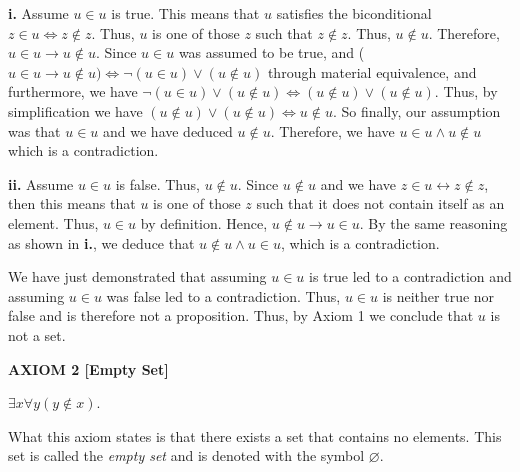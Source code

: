 \documentclass[12pt, a4paper]{article}
\begin{document}
\vspace{4mm}

\textbf{i.} Assume $u\in u$ is true. This means that $u$ satisfies the biconditional $z\in u\Leftrightarrow z\notin z$. Thus, $u$ is one of those $z$ such that $z\notin z$. Thus, $u\notin u$. Therefore, $u\in u\rightarrow u\notin u$. Since $u\in u$ was assumed to be true, and ($u\in u\rightarrow u\notin u)\Leftrightarrow\neg(u\in u)\vee (u\notin u)$ through material equivalence, and furthermore, we have $\neg(u\in u)\vee(u\notin u)\Leftrightarrow (u\notin u)\vee (u\notin u)$. Thus, by simplification we have $(u\notin u)\vee(u\notin u)\Leftrightarrow u\notin u$. So finally, our assumption was that $u\in u$ and we have deduced $u\notin u$. Therefore, we have $u\in u\wedge u\notin u$ which is a contradiction.\par

\vspace{4mm}

\textbf{ii.} Assume $u\in u$ is false. Thus, $u\notin u$. Since $u\notin u$ and we have $z\in u\leftrightarrow z\notin z$, then this means that $u$ is one of those $z$ such that it does not contain itself as an element. Thus, $u\in u$ by definition. Hence, $u\notin u\rightarrow u\in u$. By the same reasoning as shown in \textbf{i.}, we deduce that $u\notin u\wedge u\in u$, which is a contradiction.\par

\vspace{4mm}

\noindent We have just demonstrated that assuming $u\in u$ is true led to a contradiction and assuming $u\in u$ was false led to a contradiction. Thus, $u\in u$ is neither true nor false and is therefore not a proposition. Thus, by Axiom 1 we conclude that $u$ is not a set.\par

\vspace{10mm}

\noindent\blacksquare\textbf{ AXIOM 2 [Empty Set]}\par

\vspace{4mm}

$\exists x\forall y(y\notin x)$.\par

\vspace{4mm}

\noindent What this axiom states is that there exists a set that contains no elements. This set is called the \textit{empty set} and is denoted with the symbol $\varnothing$.\par
\end{document}
